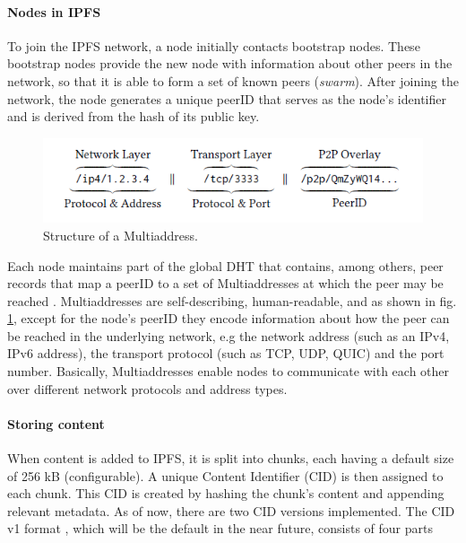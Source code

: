 \paragraph{Nodes in IPFS}\label{par:nodes_ipfs}
To join the IPFS network, a node initially contacts bootstrap nodes. These bootstrap nodes provide the new node with information about other peers in the network, so that it is able to form a set of known peers (\textit{swarm}). After joining the network, the node generates a unique peerID that serves as the node's identifier and is derived from the hash of its public key.

\begin{figure}[htbp]
    \centerline{\includegraphics{figs/Multiaddress.png}}
    \caption{Structure of a Multiaddress. \citep{trautwein_2022}}
    \label{fig:multiaddress}
\end{figure}

Each node maintains part of the global DHT that contains, among others, peer records that map a peerID to a set of Multiaddresses at which the peer may be reached \citep{schmahmann_2020}. Multiaddresses \citep{multiaddress_2023} are self-describing, human-readable, and as shown in fig. \ref{fig:multiaddress}, except for the node's peerID they encode information about how the peer can be reached in the underlying network, e.g the network address (such as an IPv4, IPv6 address), the transport protocol (such as TCP, UDP, QUIC) and the port number. Basically, Multiaddresses enable nodes to communicate with each other over different network protocols and address types.

\paragraph{Storing content}\label{par:storing_ipfs}
When content is added to IPFS, it is split into chunks, each having a default size of 256 kB (configurable). A unique Content Identifier (CID) is then assigned to each chunk. This CID is created by hashing the chunk's content and appending relevant metadata. As of now, there are two CID versions implemented. The CID v1 format \citep{multiformat}, which will be the default in the near future, consists of four parts


